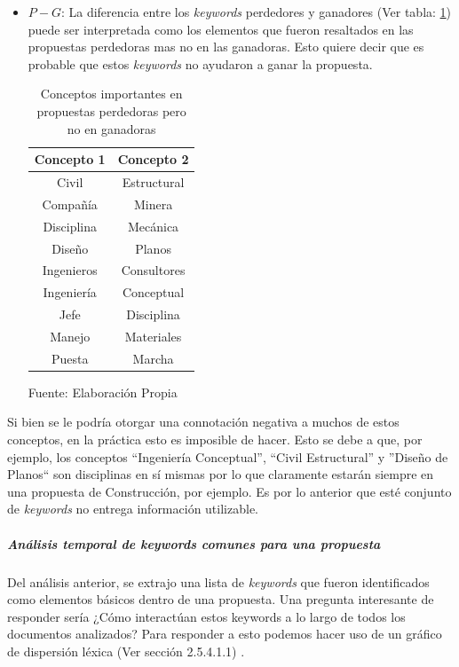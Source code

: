 \begin{itemize}
        \item $P - G$: La diferencia entre los \textit{keywords} perdedores y ganadores (Ver tabla: \ref{table:Conceptos_sin_valor}) puede ser interpretada como los elementos que fueron resaltados en las propuestas perdedoras mas no en las ganadoras. Esto quiere decir que es probable que estos \textit{keywords} no ayudaron a ganar la propuesta.
        
        \begin{table}[H]
        \centering
        \begin{tabular}{|c|c|}
        \hline
        \textbf{Concepto 1} & \textbf{Concepto 2} \\ \hline
        Civil               & Estructural         \\ \hline
        Compañía            & Minera              \\ \hline
        Disciplina          & Mecánica            \\ \hline
        Diseño              & Planos              \\ \hline
        Ingenieros          & Consultores         \\ \hline
        Ingeniería          & Conceptual          \\ \hline
        Jefe                & Disciplina          \\ \hline
        Manejo              & Materiales          \\ \hline
        Puesta              & Marcha              \\ \hline
        \end{tabular}
        \caption{\label{table:Conceptos_sin_valor} Conceptos importantes en propuestas perdedoras pero no en ganadoras} Fuente: Elaboración Propia
        \end{table}
    \end{itemize}
    Si bien se le podría otorgar una connotación negativa a muchos de estos conceptos, en la práctica esto es imposible de hacer. Esto se debe a que, por ejemplo, los conceptos ``Ingeniería Conceptual'', ``Civil Estructural'' y ''Diseño de Planos`` son disciplinas en sí mismas por lo que claramente estarán siempre en una propuesta de Construcción, por ejemplo. Es por lo anterior que esté conjunto de \textit{keywords} no entrega información utilizable.
\subparagraph{Análisis temporal de keywords comunes para una propuesta} 
\subparagraph*{}
    Del análisis anterior, se extrajo una lista de \textit{keywords} que fueron identificados como elementos básicos dentro de una propuesta. Una pregunta interesante de responder sería ¿Cómo interactúan estos keywords a lo largo de todos los documentos analizados? Para responder a esto podemos hacer uso de un gráfico de dispersión léxica (Ver sección 2.5.4.1.1) .
    
